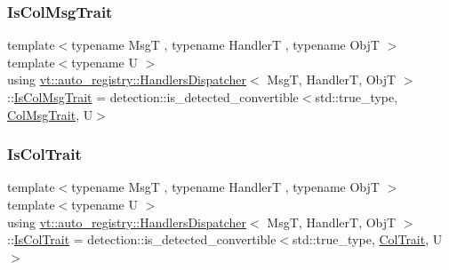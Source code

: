 \mbox{\label{structvt_1_1auto__registry_1_1_handlers_dispatcher_a585421b015b2d94915817c509e38b073}} 
\subsubsection{\texorpdfstring{Is\+Col\+Msg\+Trait}{IsColMsgTrait}}
{\footnotesize\ttfamily template$<$typename MsgT , typename HandlerT , typename ObjT $>$ \\
template$<$typename U $>$ \\
using \hyperlink{structvt_1_1auto__registry_1_1_handlers_dispatcher}{vt\+::auto\+\_\+registry\+::\+Handlers\+Dispatcher}$<$ MsgT, HandlerT, ObjT $>$\+::\hyperlink{structvt_1_1auto__registry_1_1_handlers_dispatcher_a585421b015b2d94915817c509e38b073}{Is\+Col\+Msg\+Trait} =  detection\+::is\+\_\+detected\+\_\+convertible$<$std\+::true\+\_\+type, \hyperlink{structvt_1_1auto__registry_1_1_handlers_dispatcher_aa2e8b80baa4dffdd9b2476ca9d2a7b46}{Col\+Msg\+Trait}, U$>$}

\mbox{\label{structvt_1_1auto__registry_1_1_handlers_dispatcher_aa5e51c30b4d5124a98d04bdc2be043ac}} 
\subsubsection{\texorpdfstring{Is\+Col\+Trait}{IsColTrait}}
{\footnotesize\ttfamily template$<$typename MsgT , typename HandlerT , typename ObjT $>$ \\
template$<$typename U $>$ \\
using \hyperlink{structvt_1_1auto__registry_1_1_handlers_dispatcher}{vt\+::auto\+\_\+registry\+::\+Handlers\+Dispatcher}$<$ MsgT, HandlerT, ObjT $>$\+::\hyperlink{structvt_1_1auto__registry_1_1_handlers_dispatcher_aa5e51c30b4d5124a98d04bdc2be043ac}{Is\+Col\+Trait} =  detection\+::is\+\_\+detected\+\_\+convertible$<$std\+::true\+\_\+type, \hyperlink{structvt_1_1auto__registry_1_1_handlers_dispatcher_a0d707c7f0650f1185b5628aa71a98c87}{Col\+Trait}, U$>$}



